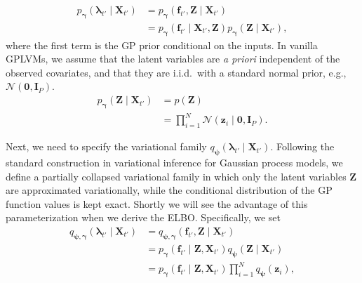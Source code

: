 \begin{align}
    p_{\boldsymbol{\gamma}}(\boldsymbol{\lambda}_{t'}\mid \mathbf{X}_{t'}) 
    &= p_{\boldsymbol{\gamma}}(\mathbf{f}_{t'}, \mathbf{Z} \mid \mathbf{X}_{t'}) \\
    &= p_{\boldsymbol{\gamma}}(\mathbf{f}_{t'} \mid \mathbf{X}_{t'}, \mathbf{Z}) p_{\boldsymbol{\gamma}}(\mathbf{Z}\mid \mathbf{X}_{t'}),
\end{align}
where the first term is the GP prior conditional on the inputs. 
In vanilla GPLVMs, 
we assume that the latent variables are \emph{a priori} 
independent of the observed covariates, and that they are i.i.d.\ 
with a standard normal prior, e.g., \(\mathcal{N}(\mathbf{0}, \mathbf{I}_P)\).
\begin{align}
p_{\boldsymbol{\gamma}}(\mathbf{Z}\mid \mathbf{X}_{t'})
&= p(\mathbf{Z})\\
&= \prod_{i=1}^N \mathcal{N}(\mathbf{z}_i \mid \mathbf{0}, \mathbf{I}_P).
\label{eq:gplvm_latent_prior}
\end{align}

Next, we need to specify the variational family $q_{\boldsymbol{\psi}}(\boldsymbol{\lambda}_{t'}\mid \mathbf{X}_{t'})$. 
Following the standard construction in variational inference for Gaussian process models, 
we define a partially collapsed variational family in which only the latent variables $\mathbf{Z}$ 
are approximated variationally, while the conditional distribution of the GP function values is 
kept exact. Shortly we will see the advantage of this parameterization when we derive the ELBO. Specifically, we set
\begin{align}
    q_{\boldsymbol{\psi},\boldsymbol{\gamma}}(\boldsymbol{\lambda}_{t'}\mid \mathbf{X}_{t'}) 
    &= q_{\boldsymbol{\psi},\boldsymbol{\gamma}}(\mathbf{f}_{t'}, \mathbf{Z}\mid \mathbf{X}_{t'}) \\
    &= p_{\boldsymbol{\gamma}}(\mathbf{f}_{t'} \mid \mathbf{Z}, \mathbf{X}_{t'}) q_{\boldsymbol{\psi}}(\mathbf{Z}\mid \mathbf{X}_{t'}) \\
    &= p_{\boldsymbol{\gamma}}(\mathbf{f}_{t'} \mid \mathbf{Z}, \mathbf{X}_{t'}) \prod_{i=1}^N q_{\boldsymbol{\psi}}(\mathbf{z}_i),
    \label{eq:gplvm_var_posterior}
\end{align}  
 
